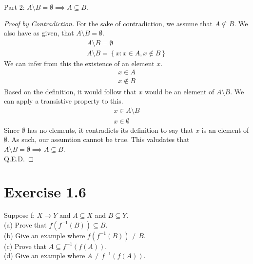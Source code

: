 \documentclass[12pt]{report}
\begin{document}
Part 2: $A \setminus B = \emptyset \implies A \subseteq B$.
\begin{proof}[Proof by Contradiction]
    For the sake of contradiction, we assume that $A \nsubseteq B$.
    We also have as given, that $A \setminus B = \emptyset$.
    \begin{gather}
        A \setminus B = \emptyset\\
        A \setminus B = \left\{x: x \in A, x \notin B\right\}
    \end{gather}
    We can infer from this the existence of an element $x$.
    \begin{gather}
        x \in A\\
        x \notin B
    \end{gather}
    Based on the definition, it would follow that $x$ would be an element of $A \setminus B$.
    We can apply a transistive property to this.
    \begin{gather}
        x \in A \setminus B\\
        x \in \emptyset
    \end{gather}
    Since $\emptyset$ has no elements, it contradicts its definition to say that $x$ is an element of $\emptyset$.
    As such, our assumtion cannot be true. 
    This valudates that $A \setminus B = \emptyset \implies A \subseteq B$.\\
    Q.E.D.
\end{proof}

\pagebreak
\section{Exercise 1.6}
Suppose f: $X \rightarrow Y$ and $A \subseteq X$ and $B \subseteq Y$.\\
(a) Prove that $f(f^{-1}(B)) \subseteq B$.\\
(b) Give an example where $f(f^{-1}(B)) \neq B$.\\
(c) Prove that $A \subseteq f^{-1}(f(A))$.\\
(d) Give an example where $A \neq f^{-1}(f(A))$.
\end{document}
